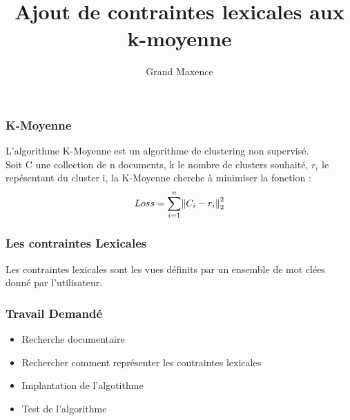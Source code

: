 \documentclass{beamer}
\begin{document}
\title{Ajout de contraintes lexicales aux k-moyenne}
\author{Grand Maxence}
\maketitle

\begin{frame}
  \frametitle{K-Moyenne}

  L'algorithme K-Moyenne est un algorithme de clustering non supervis\'e.
\\
  Soit C une collection de n documents, k le nombre de clusters souhait\'e, $r_i$
  le rep\'esentant du cluster i, la K-Moyenne cherche \`a minimiser la fonction : 
\\
\[
Loss = \sum_{i=1}^n \norm{C_i - r_i}_2^2
\]
\end{frame}

\begin{frame}
  \frametitle{Les contraintes Lexicales}
  Les contraintes lexicales sont les vues d\'efinits par un ensemble de mot cl\'ees
  donn\'e par l'utilisateur.
\end{frame}

\begin{frame}
  \frametitle{Travail Demand\'e}
  \begin{itemize}
  \item Recherche documentaire
  \item Rechercher comment repr\'esenter les contraintes lexicales
  \item Implantation de l'algotithme
  \item Test de l'algorithme
  \end{itemize}
\end{frame}
\end{document}
